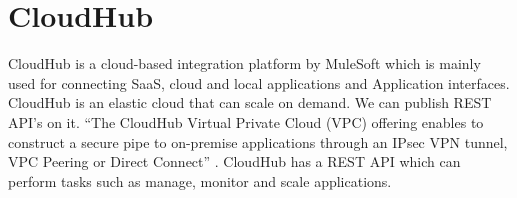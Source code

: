 \section{CloudHub}

CloudHub is a cloud-based integration platform by MuleSoft which is mainly 
used for connecting SaaS, cloud and local applications and Application 
interfaces. CloudHub is an elastic cloud that can scale on demand. We can 
publish REST API's on it. ``The CloudHub Virtual Private Cloud (VPC) offering 
enables to construct a secure pipe to on-premise applications through an 
IPsec VPN tunnel, VPC Peering or Direct Connect'' 
\cite{hid-sp18-418-CloudHub-docs}. CloudHub has a REST API which can perform 
tasks such as manage, monitor and scale applications.

